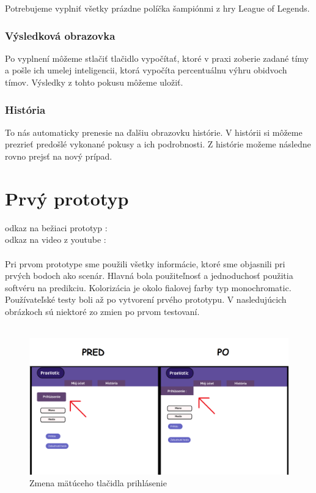 Potrebujeme vyplniť všetky prázdne políčka šampiónmi z hry League of Legends.

\subsubsection{Výsledková obrazovka}

Po vyplnení môžeme stlačiť tlačidlo vypočítať, ktoré v praxi zoberie zadané tímy a pošle ich umelej inteligencii, ktorá vypočíta percentuálnu výhru obidvoch tímov. Výsledky z tohto pokusu môžeme uložiť.

\subsubsection{História}

To nás automaticky prenesie na ďalšiu obrazovku histórie. V histórii si môžeme prezrieť predošlé vykonané pokusy a ich podrobnosti. Z histórie možeme následne rovno prejsť na nový prípad.





\section*{Prvý prototyp}

odkaz na bežiaci prototyp :
\cite{figma}
\\
odkaz na video z youtube :
\cite{youtube}
\\ \\
Pri prvom prototype sme použili všetky informácie, ktoré sme objasnili pri prvých bodoch ako scenár. Hlavná bola použiteľnosť a jednoduchosť použitia softvéru na predikciu. Kolorizácia je okolo fialovej farby typ monochromatic. Používateľské testy boli až po vytvorení prvého prototypu. V nasledujúcich obrázkoch sú niektoré zo zmien po prvom testovaní.
\\ \\



\begin{figure}[h!]
	
	\includegraphics[width=.9\textwidth]{figures/predtym}
	
	\centering
	
	\caption{ Zmena mätúceho tlačidla prihlásenie\label{predtym}}
	
\end{figure}





